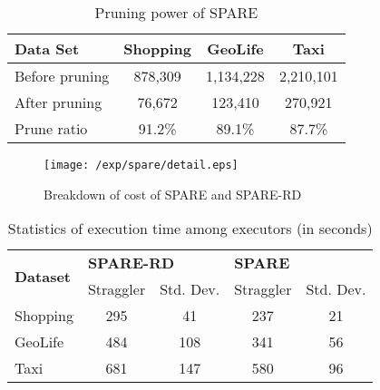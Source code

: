 \begin{table}[h]
\centering
\begin{tabular}{|l|c|c|c|}
\hline 
\textbf{Data Set} & \textbf{Shopping} & \textbf{GeoLife} & \textbf{Taxi} \\ 
\hline 
Before pruning & 878,309 &  1,134,228 & 2,210,101 \\ 
\hline 
After pruning & 76,672 & 123,410 & 270,921 \\ 
\hline 
Prune ratio & 91.2\% & 89.1\% & 87.7\% \\ 
\hline 
\end{tabular} 

\caption{Pruning power of SPARE}
\label{tbl:pruning}
\end{table}

\begin{figure}[h]
\centering
	  \texttt{[image: /exp/spare/detail.eps]}
    \caption{Breakdown of cost of SPARE and SPARE-RD}
    \label{exp:wl}
%    
\end{figure}

\begin{table}[h]
\centering \small
\begin{tabular}{|l|c|c|c|c|}
\hline
\multirow{2}{*}{\textbf{Dataset}} & \multicolumn{2}{l|}{\textbf{SPARE-RD}} & \multicolumn{2}{l|}{\textbf{SPARE}} \\ \cline{2-5} 
                         & Straggler        & Std. Dev.     & Straggler       & Std. Dev.      \\ \hline
Shopping                 & 295              & 41         & 237             & 21       \\ \hline
GeoLife                  & 484              & 108        & 341             & 56       \\ \hline
Taxi                     & 681              & 147        & 580             & 96       \\ \hline
\end{tabular}
  \caption{Statistics of execution time among executors (in seconds)}
  \label{tbl:strags}
\end{table}

